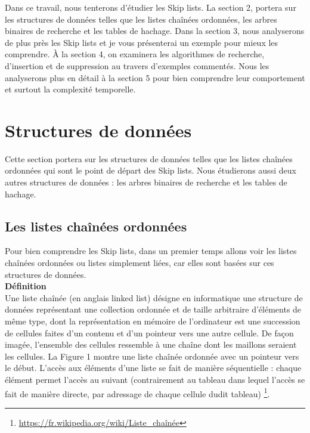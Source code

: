 \documentclass[hidelinks,a4paper,12pt]{article}
\begin{document}
Dans ce travail, nous tenterons d'étudier les Skip lists. La section 2, portera sur les structures de données telles que les listes chaînées ordonnées, les arbres binaires de recherche et les tables de hachage. Dans la section 3, nous analyserons de plus près les Skip lists et je vous présenterai un exemple pour mieux les comprendre. À la section 4, on examinera les algorithmes de recherche, d'insertion et de suppression au travers d’exemples commentés. Nous les analyserons plus en détail à la section 5 pour bien comprendre leur comportement et surtout la complexité temporelle.

	
	\section{Structures de données}
Cette section portera sur les structures de données telles que les listes chaînées ordonnées qui sont le point de départ des Skip lists. Nous étudierons aussi deux autres structures de données : les arbres binaires de recherche et les tables de hachage.

	\subsection{Les listes chaînées ordonnées}
Pour bien comprendre les Skip lists, dans un premier temps allons voir les listes chaînées ordonnées ou listes simplement liées, car elles sont basées sur ces structures de données.  
\\[0.5cm] 	
	\textbf {Définition} \medskip \\
Une liste chaînée (en anglais linked list) désigne en informatique une structure de données représentant une collection ordonnée et de taille arbitraire d'éléments de même type, dont la représentation en mémoire de l'ordinateur est une succession de cellules faites d'un contenu et d'un pointeur vers une autre cellule. De façon imagée, l'ensemble des cellules ressemble à une chaîne dont les maillons seraient les cellules. La Figure 1 montre une liste chaînée ordonnée avec un pointeur vers le début. L'accès aux éléments d'une liste se fait de manière séquentielle : chaque élément permet l'accès au suivant (contrairement au tableau dans lequel l'accès se fait de manière directe, par adressage de chaque cellule dudit tableau) \footnote[3]{\url{https://fr.wikipedia.org/wiki/Liste\_chaînée}}. 
\end{document}
